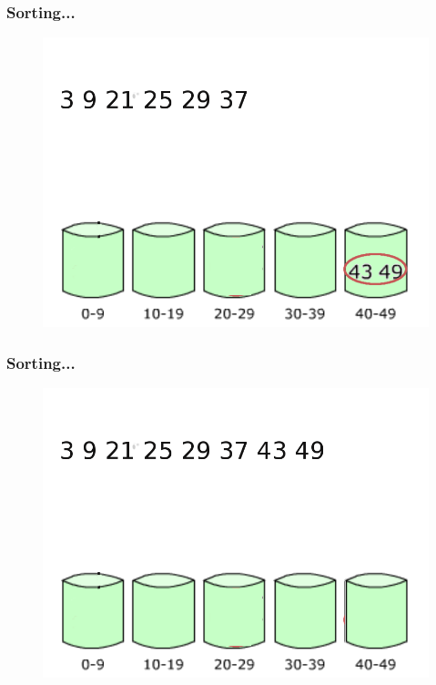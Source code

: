 \documentclass[pdf]{beamer}
\begin{document}
\begin{frame}
	\frametitle{Sorting...}
	\begin{figure}
		\includegraphics[scale=.3]{Figure/20.png}
	\end{figure}	
\end{frame}
\begin{frame}
	\frametitle{Sorting...}
	\begin{figure}
		\includegraphics[scale=.3]{Figure/21.png}
	\end{figure}	
\end{frame}
\end{document}
